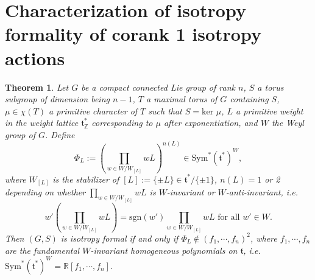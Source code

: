 \documentclass[11pt]{amsart}
\theoremstyle{plain}
\newtheorem{theorem}{Theorem}[section]
\theoremstyle{definition}
\begin{document}
\section{Characterization of isotropy formality of corank 1 isotropy actions}
\begin{theorem}\label{invtpoly}
	Let $G$ be a compact connected Lie group of rank $n$, $S$ a torus subgroup of dimension being $n-1$, $T$ a maximal torus of $G$ containing $S$, $\mu\in \chi(T)$ a primitive character of $T$ such that $S=\text{ker }\mu$, $L$ a primitive weight in the weight lattice $\mathfrak{t}^*_\mathbb{Z}$ corresponding to $\mu$ after exponentiation, and $W$ the Weyl group of $G$. Define
	\[\Phi_L:=\left(\prod_{w\in W/W_{[L]}} wL\right)^{n(L)}\in \text{Sym}^*(\mathfrak{t}^*)^W,\]
	where $W_{[L]}$ is the stabilizer of $[L]:=\{\pm L\}\in \mathfrak{t}^*/\{\pm 1\}$, $n(L)=1$ or 2 depending on whether $\displaystyle\prod_{w\in W/W_{[L]}}wL$ is $W$-invariant or $W$-anti-invariant, i.e. 
	\[\displaystyle w'(\prod_{w\in W/W_{[L]}}wL)=\text{sgn}(w')\prod_{w\in W/W_{[L]}}wL\text{ for all }w'\in W.\] 
	Then $(G, S)$ is isotropy formal if and only if $\Phi_L\notin (f_1, \cdots, f_n)^2$, where $f_1, \cdots, f_n$ are the fundamental $W$-invariant homogeneous polynomials on $\mathfrak{t}$, i.e. $\text{Sym}^*(\mathfrak{t}^*)^W=\mathbb{R}[f_1, \cdots, f_n]$.
\end{theorem}
\end{document}
